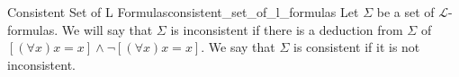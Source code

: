 \begin{definition}{Consistent Set of L Formulas}{consistent_set_of_l_formulas}
Let $\Sigma$ be a set of $\mathcal{L}$-formulas. We will say that $\Sigma$ is inconsistent if there is a deduction from $\Sigma$ of $[(\forall x) x=x] \wedge \neg[(\forall x) x=x]$. We say that $\Sigma$ is consistent if it is not inconsistent.
\end{definition}
